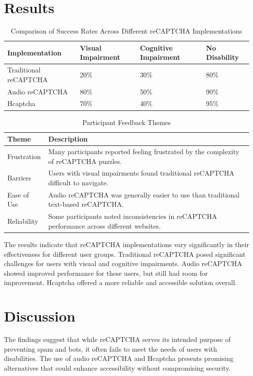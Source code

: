 \documentclass{article}
\begin{document}
\section{Results}
\begin{table}[ht]
\centering
\caption{Comparison of Success Rates Across Different reCAPTCHA Implementations}
\label{tab:success_rates}
\begin{tabular}{@{}llll@{}}
\toprule
\textbf{Implementation} & \textbf{Visual Impairment} & \textbf{Cognitive Impairment} & \textbf{No Disability} \\ \midrule
Traditional reCAPTCHA & 20\% & 30\% & 80\% \\
Audio reCAPTCHA & 80\% & 50\% & 90\% \\
Hcaptcha & 70\% & 40\% & 95\% \\ \bottomrule
\end{tabular}
\end{table}

\begin{table}[ht]
\centering
\caption{Participant Feedback Themes}
\label{tab:feedback_themes}
\begin{tabular}{@{}lX@{}}
\toprule
\textbf{Theme} & \textbf{Description} \\ \midrule
Frustration & Many participants reported feeling frustrated by the complexity of reCAPTCHA puzzles. \\
Barriers & Users with visual impairments found traditional reCAPTCHA difficult to navigate. \\
Ease of Use & Audio reCAPTCHA was generally easier to use than traditional text-based reCAPTCHA. \\
Reliability & Some participants noted inconsistencies in reCAPTCHA performance across different websites. \\ \bottomrule
\end{tabular}
\end{table}

The results indicate that reCAPTCHA implementations vary significantly in their effectiveness for different user groups. Traditional reCAPTCHA posed significant challenges for users with visual and cognitive impairments. Audio reCAPTCHA showed improved performance for these users, but still had room for improvement. Hcaptcha offered a more reliable and accessible solution overall.

\section{Discussion}
The findings suggest that while reCAPTCHA serves its intended purpose of preventing spam and bots, it often fails to meet the needs of users with disabilities. The use of audio reCAPTCHA and Hcaptcha presents promising alternatives that could enhance accessibility without compromising security.
\end{document}

